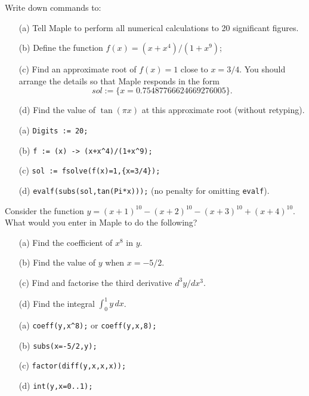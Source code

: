 \documentclass[a4paper]{article}
\begin{document}
\begin{problem}
 Write down commands to:
 \begin{itemize}
  \item[(a)] Tell Maple to perform all numerical calculations to 20
   significant figures. 
  \item[(b)] Define the function $f(x)=(x+x^4)/(1+x^9)$; 
  \item[(c)] Find an approximate root of $f(x)=1$ close to
   $x=3/4$.   You should arrange the details so that Maple responds in
   the form
   \[ sol := \{x = 0.75487766624669276005\}. \]
  \item[(d)] Find the value of $\tan(\pi x)$ at this approximate root
   (without retyping). 
 \end{itemize}
\end{problem}
\begin{solution}
 \begin{itemize}
  \item[(a)] \verb~Digits := 20;~ 
  \item[(b)] \verb~f := (x) -> (x+x^4)/(1+x^9);~ 
  \item[(c)] \verb~sol := fsolve(f(x)=1,{x=3/4});~ 
  \item[(d)] \verb~evalf(subs(sol,tan(Pi*x)));~ 
   (no penalty for omitting \verb~evalf~).
 \end{itemize}
\end{solution}

\begin{problem}
 Consider the function
 $y=(x+1)^{10}-(x+2)^{10}-(x+3)^{10}+(x+4)^{10}$.  What would you
 enter in Maple to do the following?
\begin{itemize}
 \item[(a)] Find the coefficient of $x^8$ in $y$. 
 \item[(b)] Find the value of $y$ when $x=-5/2$. 
 \item[(c)] Find and factorise the third derivative $d^3y/dx^3$. 
 \item[(d)] Find the integral $\int_0^1 y\,dx$. 
\end{itemize}
\end{problem}
\begin{solution}
 \begin{itemize}
  \item[(a)] \verb~coeff(y,x^8);~ or \verb~coeff(y,x,8);~ \mk
  \item[(b)] \verb~subs(x=-5/2,y);~ \mk
  \item[(c)] \verb~factor(diff(y,x,x,x));~  
  \item[(d)] \verb~int(y,x=0..1);~ \mk 
 \end{itemize}
\end{solution}
\end{document}
